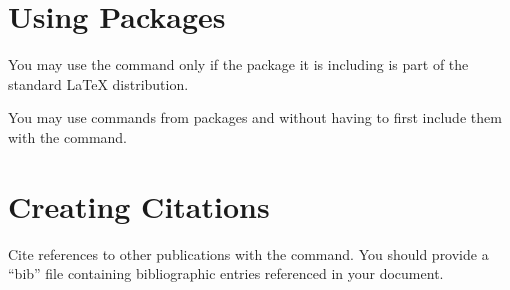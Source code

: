 \documentclass[11pt]{article}
\begin{document}

\section{Using Packages}

You may use the  command only if the package it is
including is part of the standard \LaTeX{} distribution.  

You may use commands from packages  and
 without having to first include them with the
 command.

\section{Creating Citations}

Cite references to other publications with the  command.
You should provide a ``bib'' file containing bibliographic entries
referenced in your document.


\begin{htmlonly}

\end{htmlonly}
\end{document}
